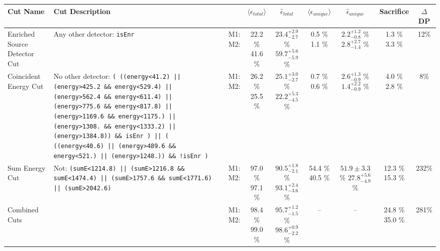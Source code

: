 \small
\begin{tabular}{|>{\raggedright}m{3cm}|m{6cm}|c c c|c c|c|c|}
\hline
  Cut Name & Cut Description &   & $\langle\epsilon_{total}\rangle$ & $\hat{\epsilon}_{total}$ & $\langle\epsilon_{unique}\rangle$ & $\hat{\epsilon}_{unique}$ & Sacrifice & $\Delta$DP \\
\hline
  Enriched Source Detector Cut & \tiny Any other detector: \texttt{isEnr} & \makecell{M1: \\ M2:} & \makecell{22.2 \% \\ 41.6 \%} & \makecell{$23.4^{+2.9}_{-2.7}$ \% \\ $59.7^{+5.6}_{-5.9}$ \%} & \makecell{0.5 \% \\ 1.1 \%} & \makecell{$2.2^{+1.2}_{-0.8}$ \% \\ $2.8^{+2.7}_{-1.4}$ \%} & \makecell{1.3 \% \\ 3.3 \%} & 12\% \\
  Coincident Energy Cut & \tiny No other detector: \texttt{( ((energy<41.2) || (energy>425.2 \&\& energy<529.4) || (energy>562.4 \&\& energy<611.4) || (energy>775.6 \&\& energy<817.8) || (energy>1169.6 \&\& energy<1175.) || (energy>1308. \&\& energy<1333.2) || (energy>1384.8)) \&\& isEnr ) || ( ((energy<40.6) || (energy>489.6 \&\& energy<521.) || (energy>1248.)) \&\& !isEnr )} & \makecell{M1: \\ M2:} & \makecell{26.2 \% \\ 25.5 \%} & \makecell{$25.1^{+3.0}_{-2.7}$ \% \\ $22.2^{+5.3}_{-4.5}$ \%} & \makecell{0.7 \% \\ 0.6 \%} & \makecell{$2.6^{+1.3}_{-0.9}$ \% \\ $1.4^{+2.2}_{-0.9}$ \%} & \makecell{4.0 \% \\ 2.8 \%} & 8\% \\
  Sum Energy Cut & \tiny Not:  \texttt{(sumE<1214.8) || (sumE>1216.8 \&\& sumE<1474.4) || (sumE>1757.6 \&\& sumE<1771.6) || (sumE>2042.6)} & \makecell{M1: \\ M2:} & \makecell{97.0 \% \\ 97.1 \%} & \makecell{$90.5^{+1.8}_{-2.1}$ \% \\ $93.1^{+2.4}_{-3.6}$ \%} & \makecell{54.4 \% \\ 40.5 \%} & \makecell{$51.9 \pm 3.3$ \% \\ $27.8^{+5.6}_{-4.9}$ \%} & \makecell{12.3 \% \\ 15.3 \%} & 232\% \\
  Combined Cuts &  & \makecell{M1: \\ M2:} & \makecell{98.4 \% \\ 99.0 \%} & \makecell{$95.7^{+1.2}_{-1.5}$ \% \\ $98.6^{+0.9}_{-2.2}$ \%} & -- & -- & \makecell{24.8 \% \\ 35.0 \%} & 281\% \\
\hline
\end{tabular}
